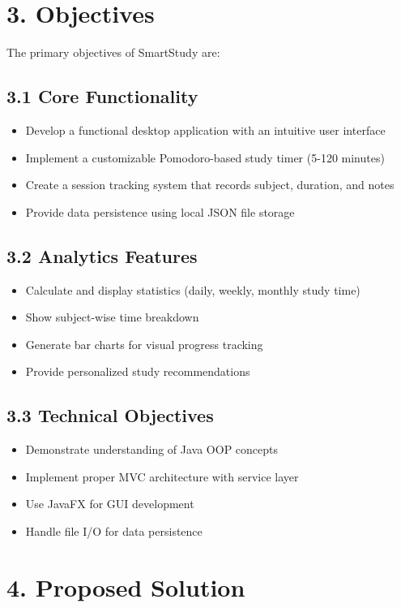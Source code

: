 \documentclass[12pt,a4paper]{article}
\begin{document}
\section{3. Objectives}

The primary objectives of SmartStudy are:

\subsection{3.1 Core Functionality}
\begin{itemize}
    \item Develop a functional desktop application with an intuitive user interface
    \item Implement a customizable Pomodoro-based study timer (5-120 minutes)
    \item Create a session tracking system that records subject, duration, and notes
    \item Provide data persistence using local JSON file storage
\end{itemize}

\subsection{3.2 Analytics Features}
\begin{itemize}
    \item Calculate and display statistics (daily, weekly, monthly study time)
    \item Show subject-wise time breakdown
    \item Generate bar charts for visual progress tracking
    \item Provide personalized study recommendations
\end{itemize}

\subsection{3.3 Technical Objectives}
\begin{itemize}
    \item Demonstrate understanding of Java OOP concepts
    \item Implement proper MVC architecture with service layer
    \item Use JavaFX for GUI development
    \item Handle file I/O for data persistence
\end{itemize}

\section{4. Proposed Solution}
\end{document}
